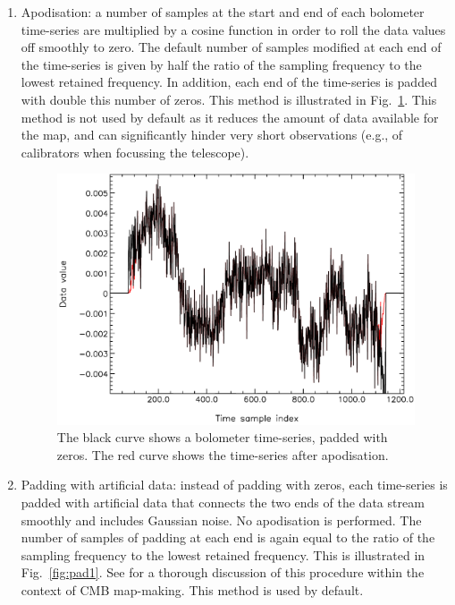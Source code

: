 \documentclass[useAMS,usenatbib,nofootinbib]{mn2e}
\begin{document}
\begin{enumerate}

\item Apodisation: a number of samples at the start and end of each
bolometer time-series are multiplied by a cosine function in order to
roll the data values off smoothly to zero. The default number of
samples modified at each end of the time-series is given by half the
ratio of the sampling frequency to the lowest retained frequency. In
addition, each end of the time-series is padded with double this
number of zeros. This method is illustrated in
Fig.~\ref{fig:pad2}. This method is not used by default as it reduces
the amount of data available for the map, and can significantly hinder
very short observations (e.g., of calibrators when focussing the
telescope).

\begin{figure}
\centering
\includegraphics[width=\linewidth]{pad2.pdf}
\caption{The black curve shows a bolometer time-series, padded
with zeros. The red curve shows the time-series after apodisation.}
\label{fig:pad2}
\end{figure}

\item Padding with artificial data: instead of padding with zeros,
each time-series is padded with artificial data that connects the two
ends of the data stream smoothly and includes Gaussian noise. No
apodisation is performed. The number of samples of padding at each end
is again equal to the ratio of the sampling frequency to the lowest
retained frequency.  This is illustrated in Fig.~\ref{fig:pad1}. See
\citet{stompor2002} for a thorough discussion of this procedure within
the context of CMB map-making. This method is used by default.


\end{enumerate}
\end{document}
